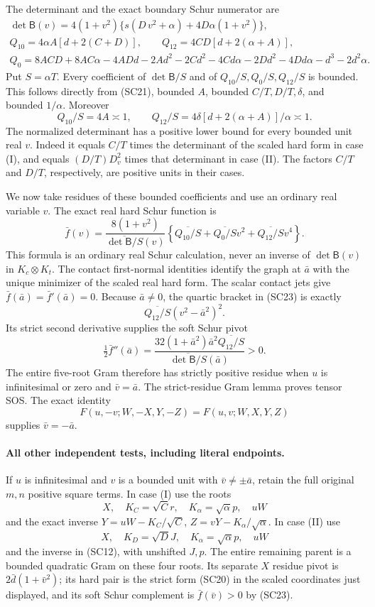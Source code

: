The determinant and the exact boundary Schur numerator are
\[
\begin{gathered}
 \det\mathsf B(v)=4(1+v^2)\{s(D\,v^2+\alpha)+4D\alpha(1+v^2)\},\\
 Q_{10}=4\alpha A[d+2(C+D)],\qquad
 Q_{12}=4CD[d+2(\alpha+A)],\\
 Q_0=8ACD+8AC\alpha-4ADd-2Ad^2-2Cd^2-4Cd\alpha
       -2Dd^2-4Dd\alpha-d^3-2d^2\alpha.             
\end{gathered}
\tag{SC21}
\]
Put $S=\alpha T$. Every coefficient of $\det\mathsf B/S$ and of
$Q_{10}/S,Q_0/S,Q_{12}/S$ is bounded. This follows directly from
(SC21), bounded $A$, bounded $C/T,D/T,\delta$, and bounded
$1/\alpha$. Moreover
\[
 Q_{10}/S=4A\asymp1,\qquad
 Q_{12}/S=4\delta[d+2(\alpha+A)]/\alpha\asymp1.       \tag{SC22}
\]
The normalized determinant has a positive lower bound for every
bounded unit real $v$. Indeed it equals $C/T$ times the determinant
of the scaled hard form in case (I), and equals
$(D/T)D_v^2$ times that determinant in case (II). The factors
$C/T$ and $D/T$, respectively, are positive units in their cases.

We now take residues of these bounded coefficients and use an
ordinary real variable $v$. The exact real hard Schur function is
\[
 \bar f(v)=
 \frac{8(1+v^2)}{\overline{\det\mathsf B/S}(v)}
 \left\{\overline{Q_{10}/S}+\overline{Q_0/S}v^2
                      +\overline{Q_{12}/S}v^4\right\}.          \tag{SC23}
\]
This formula is an ordinary real Schur calculation, never an
inverse of $\det\mathsf B(v)$ in $K_c\otimes K_t$.
The contact first-normal identities identify the graph at $\bar a$
with the unique minimizer of the scaled real hard form. The scalar
contact jets give $\bar f(\bar a)=\bar f'(\bar a)=0$.
Because $\bar a\ne0$, the quartic bracket in (SC23) is exactly
\[
 \overline{Q_{12}/S}(v^2-\bar a^2)^2.
\]
Its strict second derivative supplies the soft Schur pivot
\[
 \tfrac12\bar f''(\bar a)=
 \frac{32(1+\bar a^2)\bar a^2\overline{Q_{12}/S}}
      {\overline{\det\mathsf B/S}(\bar a)}>0.
\]
The entire five-root Gram therefore has strictly positive residue
when $u$ is infinitesimal or zero and $\bar v=\bar a$.
The strict-residue Gram lemma proves tensor SOS. The exact identity
\[
 F(u,-v;W,-X,Y,-Z)=F(u,v;W,X,Y,Z)
\]
supplies $\bar v=-\bar a$.

\paragraph{All other independent tests, including literal endpoints.}
If $u$ is infinitesimal and $v$ is a bounded unit with
$\bar v\ne\pm\bar a$, retain the full original $m,n$ positive square terms.
In case (I) use the roots
\[
 X,\quad K_C=\sqrt C r,\quad K_\alpha=\sqrt\alpha p,\quad uW
\]
and the exact inverse
$Y=uW-K_C/\sqrt C$, $Z=vY-K_\alpha/\sqrt\alpha$.
In case (II) use
\[
 X,\quad K_D=\sqrt D J,\quad K_\alpha=\sqrt\alpha p,\quad uW
\]
and the inverse in (SC12), with unshifted $J,p$.
The entire remaining parent is a bounded quadratic Gram on these
four roots. Its separate $X$ residue pivot is
$2\bar d(1+\bar v^2)$; its hard pair is the strict form (SC20)
in the scaled coordinates just displayed, and its soft Schur
complement is $\bar f(\bar v)>0$ by (SC23).

